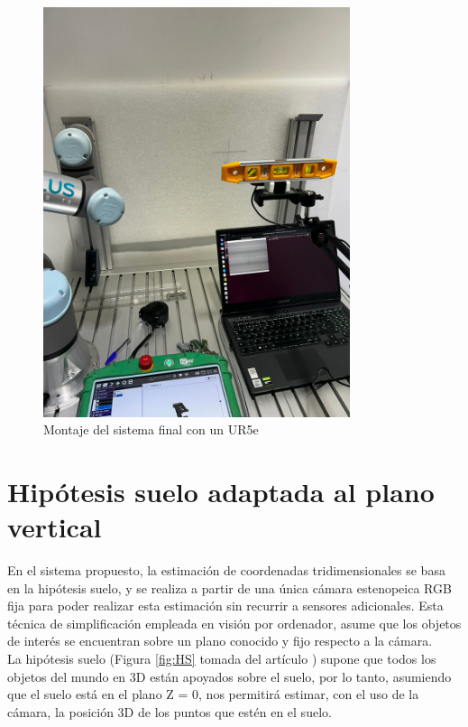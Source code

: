 \begin{figure} [H]
    \begin{center}
      \includegraphics[width=9cm]{figs/Set up coordenadas pruebas plano vertical UR5e_3.jpeg}
    \end{center}
    \caption{Montaje del sistema final con un UR5e}
    \label{fig:montaje_final}
\end{figure}
  

\section{Hipótesis suelo adaptada al plano vertical}
\label{sec:HS_vertical}

En el sistema propuesto, la estimación de coordenadas tridimensionales se basa en la hipótesis suelo, y se realiza a partir de una única cámara estenopeica RGB fija para poder realizar esta estimación sin recurrir a sensores adicionales. Esta técnica de simplificación empleada en visión por ordenador, asume que los objetos de interés se encuentran sobre un plano conocido y fijo respecto a la cámara.\\

La hipótesis suelo (Figura \ref{fig:HS} tomada del artículo \cite{Vega21}) supone que todos los objetos del mundo en 3D están apoyados sobre el suelo, por lo tanto, asumiendo que el suelo está en el plano Z = 0, nos permitirá estimar, con el uso de la cámara, la posición 3D de los puntos que estén en el suelo.


